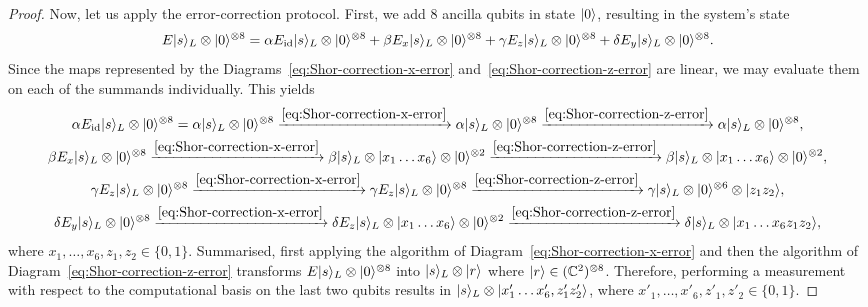 \documentclass[a4paper, oneside, 12pt]{amsart}
\begin{document}
\begin{proof}
  Now, let us apply the error-correction protocol.
  First, we add  \(8\) ancilla qubits in state \(\lvert0\rangle\), resulting in the system's state
  \begin{equation*}
    E \lvert s\rangle_{L}\otimes \lvert0\rangle^{\otimes 8}
    = \alpha E_{\mathrm{id}}\lvert s\rangle_{L}\otimes \lvert0\rangle^{\otimes 8} + \beta E_{x}\lvert s\rangle_{L}\otimes \lvert0\rangle^{\otimes 8} + \gamma E_{z}\lvert s\rangle_{L}\otimes \lvert0\rangle^{\otimes 8} + \delta E_{y}\lvert s\rangle_{L}\otimes \lvert0\rangle^{\otimes 8}.
  \end{equation*}
  Since the maps represented by the Diagrams~\eqref{eq:Shor-correction-x-error} and~\eqref{eq:Shor-correction-z-error} are linear, we may evaluate them on each of the summands individually.
  This yields
  \begin{gather*}
    \alpha E_{\mathrm{id}}\lvert s\rangle_{L}\otimes \lvert0\rangle^{\otimes 8}
    = \alpha \lvert s\rangle_{L}\otimes \lvert0\rangle^{\otimes 8} \xrightarrow{{\eqref{eq:Shor-correction-x-error}}}
    \alpha \lvert s\rangle_{L}\otimes \lvert0\rangle^{\otimes 8} \xrightarrow{{\eqref{eq:Shor-correction-z-error}}}
    \alpha \lvert s\rangle_{L}\otimes \lvert0\rangle^{\otimes 8},\\
    \beta E_{x}\lvert s\rangle_{L}\otimes \lvert0\rangle^{\otimes 8} \xrightarrow{{\eqref{eq:Shor-correction-x-error}}}
    \beta \lvert s\rangle_{L}\otimes \lvert x_{1} \dots x_{6}\rangle\otimes \lvert0\rangle^{\otimes 2} \xrightarrow{{\eqref{eq:Shor-correction-z-error}}}
    \beta \lvert s\rangle_{L}\otimes \lvert x_{1} \dots x_{6}\rangle\otimes \lvert0\rangle^{\otimes 2},\\
    \gamma E_{z}\lvert s\rangle_{L}\otimes \lvert0\rangle^{\otimes 8} \xrightarrow{{\eqref{eq:Shor-correction-x-error}}}
    \gamma E_{z}\lvert s\rangle_{L}\otimes \lvert0\rangle^{\otimes 8} \xrightarrow{{\eqref{eq:Shor-correction-z-error}}}
    \gamma \lvert s\rangle_{L}\otimes \lvert0\rangle^{\otimes 6}\otimes \lvert z_{1}z_{2}\rangle,\\
    \delta E_{y}\lvert s\rangle_{L}\otimes \lvert0\rangle^{\otimes 8} \xrightarrow{{\eqref{eq:Shor-correction-x-error}}}
    \delta E_{z}\lvert s\rangle_{L}\otimes \lvert x_{1} \dots x_{6}\rangle\otimes \lvert0\rangle^{\otimes 2} \xrightarrow{{\eqref{eq:Shor-correction-z-error}}}
    \delta \lvert s\rangle_{L}\otimes \lvert x_{1} \dots x_{6}z_{1}z_{2}\rangle,
  \end{gather*}
  where \(x_{1}, \dots , x_{6}, z_{1}, z_{2} \in\{0,1\}\).
  Summarised, first applying the algorithm of Diagram~\eqref{eq:Shor-correction-x-error} and then the algorithm of Diagram~\eqref{eq:Shor-correction-z-error} transforms \(E\lvert s\rangle_{L}\otimes \lvert0\rangle^{\otimes 8}\) into \(\lvert s\rangle_{L} \otimes \lvert r\rangle\) where \(\lvert r\rangle \in ( \mathbb{C}^{2})^{\otimes 8}\).
  Therefore, performing a measurement with respect to the computational basis on the last two qubits results in \(\lvert s\rangle_{L}\otimes \lvert x'_{1} \dots  x'_{6}, z_{1}' z_{2}'\rangle\), where \(x'_{1}, \dots , x'_{6}, z'_{1}, z'_{2} \in\{0,1\}\).


\end{proof}
\end{document}
